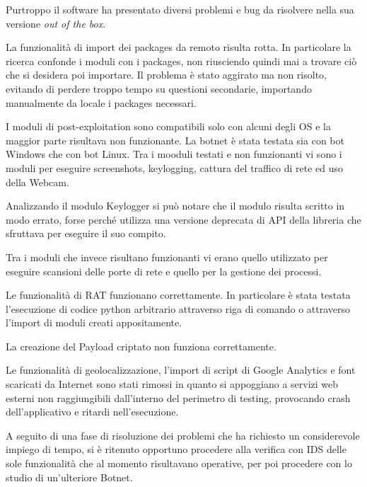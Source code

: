 Purtroppo il software ha presentato diversi problemi e bug da risolvere nella sua versione \textit{out of the box}. 

La funzionalità di import dei   packages da remoto risulta rotta. In particolare la ricerca confonde i moduli con i packages,  non riusciendo quindi mai a trovare ciò che si desidera poi importare. Il problema è stato aggirato ma non risolto, evitando di perdere troppo tempo su questioni secondarie, importando manualmente da locale i packages necessari.

I moduli di post-exploitation sono compatibili solo con alcuni degli OS e la maggior parte risultava non funzionante. 
La botnet è stata testata sia con bot Windows che con bot Linux.
Tra i mooduli  testati e non funzionanti vi sono i moduli per eseguire screenshots, keylogging, cattura del traffico di rete ed uso della  Webcam.

Analizzando il modulo Keylogger si può notare che il modulo risulta scritto in modo errato, forse perché utilizza una versione deprecata di API della libreria che sfruttava per eseguire il suo compito. 

Tra i moduli che invece risultano funzionanti vi erano quello utilizzato per eseguire scansioni delle porte di rete e quello per la gestione dei processi.

Le funzionalità di RAT funzionano correttamente.
In particolare è stata testata l'esecuzione di codice python arbitrario attraverso riga di comando o  attraverso l'import di moduli creati appositamente.

La  creazione del Payload criptato non funziona correttamente.


Le funzionalità di geolocalizzazione, l'import di script di Google Analytics e font scaricati da Internet sono stati rimossi in quanto si appoggiano a servizi web esterni non raggiungibili dall'interno del perimetro di testing, provocando crash dell'applicativo e ritardi nell'esecuzione.



A seguito di una fase di risoluzione dei problemi che ha richiesto un considerevole impiego di tempo, si è ritenuto opportuno procedere alla verifica con IDS delle sole funzionalità che al momento risultavano operative, per poi procedere con lo studio di un'ulteriore Botnet.


